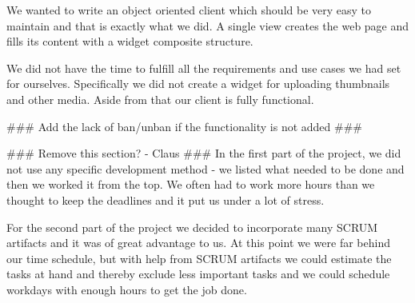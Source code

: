 We wanted to write an object oriented client which should be very easy to maintain and that is exactly what we did. A single view creates the web page and fills its content with a widget composite structure.

We did not have the time to fulfill all the requirements and use cases we had set for ourselves. Specifically we did not create a widget for uploading thumbnails and other media. Aside from that our client is fully functional.

\#\#\# Add the lack of ban/unban if the functionality is not added \#\#\#

\#\#\# Remove this section? - Claus \#\#\#
In the first part of the project, we did not use any specific development method - we listed what needed to be done and then we worked it from the top. We often had to work more hours than we thought to keep the deadlines and it put us under a lot of stress.

For the second part of the project we decided to incorporate many SCRUM artifacts and it was of great advantage to us. At this point we were far behind our time schedule, but with help from SCRUM artifacts we could estimate the tasks at hand and thereby exclude less important tasks and we could schedule workdays with enough hours to get the job done.
\newpage